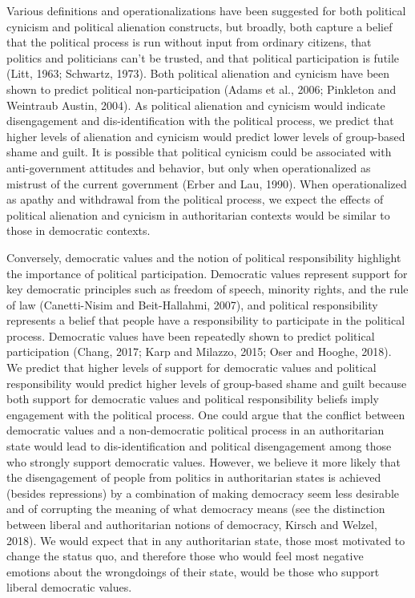 \documentclass[
]{article}
\begin{document}
Various definitions and operationalizations have been suggested for both political cynicism and political alienation constructs, but broadly, both capture a belief that the political process is run without input from ordinary citizens, that politics and politicians can't be trusted, and that political participation is futile (Litt, 1963; Schwartz, 1973). Both political alienation and cynicism have been shown to predict political non-participation (Adams et al., 2006; Pinkleton and Weintraub Austin, 2004). As political alienation and cynicism would indicate disengagement and dis-identification with the political process, we predict that higher levels of alienation and cynicism would predict lower levels of group-based shame and guilt. It is possible that political cynicism could be associated with anti-government attitudes and behavior, but only when operationalized as mistrust of the current government (Erber and Lau, 1990). When operationalized as apathy and withdrawal from the political process, we expect the effects of political alienation and cynicism in authoritarian contexts would be similar to those in democratic contexts.

Conversely, democratic values and the notion of political responsibility highlight the importance of political participation. Democratic values represent support for key democratic principles such as freedom of speech, minority rights, and the rule of law (Canetti-Nisim and Beit-Hallahmi, 2007), and political responsibility represents a belief that people have a responsibility to participate in the political process. Democratic values have been repeatedly shown to predict political participation (Chang, 2017; Karp and Milazzo, 2015; Oser and Hooghe, 2018). We predict that higher levels of support for democratic values and political responsibility would predict higher levels of group-based shame and guilt because both support for democratic values and political responsibility beliefs imply engagement with the political process. One could argue that the conflict between democratic values and a non-democratic political process in an authoritarian state would lead to dis-identification and political disengagement among those who strongly support democratic values. However, we believe it more likely that the disengagement of people from politics in authoritarian states is achieved (besides repressions) by a combination of making democracy seem less desirable and of corrupting the meaning of what democracy means (see the distinction between liberal and authoritarian notions of democracy, Kirsch and Welzel, 2018). We would expect that in any authoritarian state, those most motivated to change the status quo, and therefore those who would feel most negative emotions about the wrongdoings of their state, would be those who support liberal democratic values.
\end{document}
